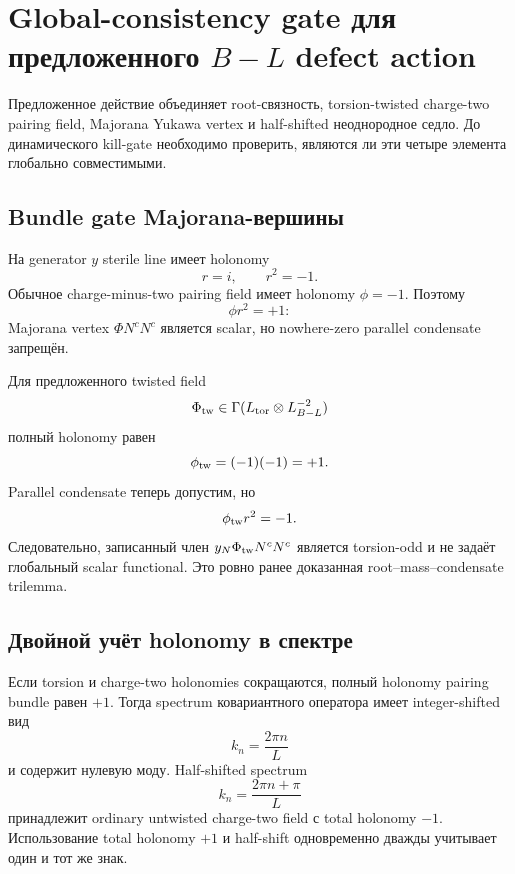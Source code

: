 \chapter{Global-consistency gate для предложенного
\texorpdfstring{\(B-L\)}{B-L} defect action}

Предложенное действие объединяет root-связность, torsion-twisted
charge-two pairing field, Majorana Yukawa vertex и half-shifted
неоднородное седло. До динамического kill-gate необходимо проверить,
являются ли эти четыре элемента глобально совместимыми.

\section{Bundle gate Majorana-вершины}

На generator \(y\) sterile line имеет holonomy
\begin{equation}
 r=i,
 \qquad
 r^2=-1.
\end{equation}
Обычное charge-minus-two pairing field имеет holonomy
\(\phi=-1\). Поэтому
\begin{equation}
 \phi r^2=+1:
\end{equation}
Majorana vertex \(\Phi N^cN^c\) является scalar, но nowhere-zero parallel
condensate запрещён.

Для предложенного twisted field
\begin{equation}
 \Phi_{\rm tw}\in
 \Gamma(L_{\rm tor}\otimes L_{B-L}^{-2})
\end{equation}
полный holonomy равен
\begin{equation}
 \phi_{\rm tw}=(-1)(-1)=+1.
\end{equation}
Parallel condensate теперь допустим, но
\begin{equation}
 \phi_{\rm tw}r^2=-1.
\end{equation}
Следовательно, записанный член
\(y_N\Phi_{\rm tw}N^cN^c\) является torsion-odd и не задаёт глобальный
scalar functional. Это ровно ранее доказанная
root--mass--condensate trilemma.

\section{Двойной учёт holonomy в спектре}

Если torsion и charge-two holonomies сокращаются, полный holonomy pairing
bundle равен \(+1\). Тогда spectrum ковариантного оператора имеет
integer-shifted вид
\begin{equation}
 k_n=\frac{2\pi n}{L}
\end{equation}
и содержит нулевую моду. Half-shifted spectrum
\begin{equation}
 k_n=\frac{2\pi n+\pi}{L}
\end{equation}
принадлежит ordinary untwisted charge-two field с total holonomy \(-1\).
Использование total holonomy \(+1\) и half-shift одновременно дважды
учитывает один и тот же знак.

